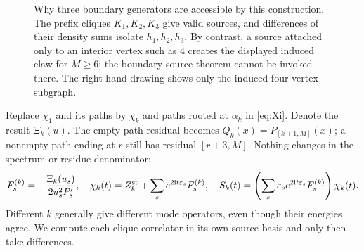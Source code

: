 \documentclass[11pt,a4paper]{article}
\newcommand{\ii}{\mathrm i}
\newcommand{\LL}{\mathcal L}
\newcommand{\eps}{\varepsilon}
\newcommand{\PP}[1]{P_{[#1]}}
\begin{document}
\begin{figure}[t]
\centering
{}
\caption{Why three boundary generators are accessible by this construction. The prefix cliques $K_1,K_2,K_3$ give valid sources, and differences of their density sums isolate $h_1,h_2,h_3$. By contrast, a source attached only to an interior vertex such as $4$ creates the displayed induced claw for $M\ge6$; the boundary-source theorem cannot be invoked there. The right-hand drawing shows only the induced four-vertex subgraph.}
\label{fig:clique}
\end{figure}

Replace $\chi_1$ and its paths by $\chi_k$ and paths rooted at $\alpha_k$ in \eqref{eq:Xi}. Denote the result $\Xi_k(u)$. The empty-path residual becomes
$Q_k(x)=\PP{k+1,M}(x)$; a nonempty path ending at $r$ still has residual $[r+3,M]$. Nothing changes in the spectrum or residue denominator:
\begin{equation}
 F_s^{(k)}=-\frac{\Xi_k(u_s)}{2u_s^2P'_s},\quad
 \chi_k(t)=Z_k^{\rm st}+\sum_se^{2\ii t\eps_s}F_s^{(k)},\quad
 S_k(t)=\left(\sum_s\eps_se^{2\ii t\eps_s}F_s^{(k)}\right)\chi_k(t).
 \label{eq:cliqueevol}
\end{equation}
Different $k$ generally give different mode operators, even though their energies agree. We compute each clique correlator in its own source basis and only then take differences.
\end{document}
